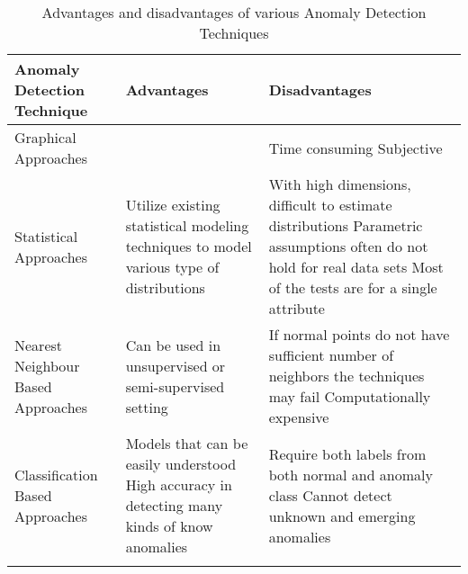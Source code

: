 \clearpage
\begin{longtable}{ | P{3cm} | P{5cm} | P{5cm} | } 
\hline
    \textbf{Anomaly Detection Technique} & \textbf{Advantages} & \textbf{Disadvantages} \\ \hline
    Graphical Approaches &
    &
        Time consuming \newline \newline
        Subjective \\ \hline
    Statistical Approaches &
        Utilize existing statistical modeling techniques to model various type of distributions
    &
        With high dimensions, difficult to estimate distributions \newline \newline
        Parametric assumptions often do not hold for real data sets \newline \newline
        Most of the tests are for a single attribute \\ \hline
    Nearest Neighbour Based Approaches &
        Can be used in unsupervised or semi-supervised setting
    &
        If normal points do not have sufficient number of neighbors the techniques may fail \newline \newline
        Computationally expensive \\ \hline
    Classification Based Approaches &
        Models that can be easily understood \newline \newline
        High accuracy in detecting many kinds of know anomalies
    &
        Require both labels from both normal and anomaly class \newline \newline
        Cannot detect unknown and emerging anomalies \\ \hline
\caption{Advantages and disadvantages of various Anomaly Detection Techniques}
\label{table:4}
\end{longtable}

